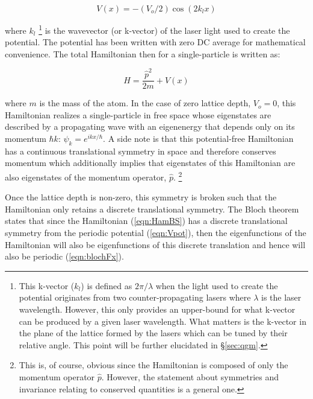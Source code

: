 
\begin{equation}
\label{eqn:Vpot}
V(x)=-(V_o/2) \cos{\left ( 2 k_l x \right )}
\end{equation}

where $k_l$ \footnote{This k-vector ($k_l$) is defined as $2\pi/\lambda$ when the light used to create the potential originates from two counter-propagating lasers where $\lambda$ is the laser wavelength. However, this only provides an upper-bound for what k-vector can be produced by a given laser wavelength. What matters is the k-vector in the plane of the lattice formed by the lasers which can be tuned by their relative angle. This point will be further elucidated in \S \ref{sec:qgm}.} is the wavevector (or k-vector) of the laser light used to create the potential. The potential has been written with zero DC average for mathematical convenience. The total Hamiltonian then for a single-particle is written as:

\begin{equation}
\label{eqn:HamBS}
H=\frac{\hat{p}^2}{2m}+V(x)
\end{equation}

where $m$ is the mass of the atom. In the case of zero lattice depth, $V_o=0$, this Hamiltonian realizes a single-particle in free space whose eigenstates are described by a propagating wave with an eigenenergy that depends only on its momentum $\hbar k$: $\psi_k = e^{i k x/\hbar}$. A side note is that this potential-free Hamiltonian has a continuous translational symmetry in space and therefore conserves momentum which additionally implies that eigenstates of this Hamiltonian are also eigenstates of the momentum operator, $\hat{p}$. \footnote{This is, of course, obvious since the Hamiltonian is composed of only the momentum operator $\hat{p}$. However, the statement about symmetries and invariance relating to conserved quantities is a general one.\cite{Weinberg2015}}

Once the lattice depth is non-zero, this symmetry is broken such that the Hamiltonian only retains a discrete translational symmetry. The Bloch theorem states that since the Hamiltonian (\ref{eqn:HamBS}) has a discrete translational symmetry from the periodic potential (\ref{eqn:Vpot}), then the eigenfunctions of the Hamiltonian will also be eigenfunctions of this discrete translation and hence will also be periodic (\ref{eqn:blochFx}).

